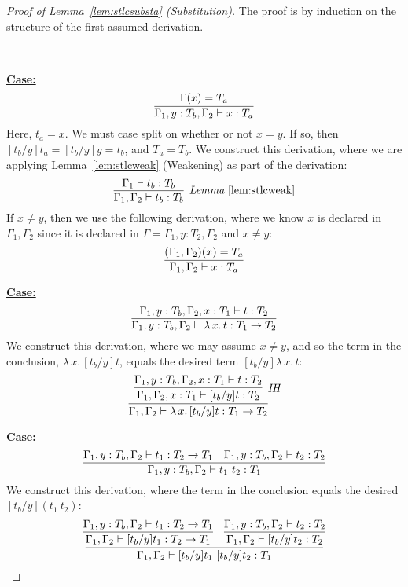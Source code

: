 \documentclass{article}
\begin{document}
\begin{proof}[Proof of Lemma~\ref{lem:stlcsubsta} (Substitution)]
The proof is by induction on the structure of the first assumed derivation.

\

\noindent \underline{\textbf{Case:}}
\[
\infer{\Gamma_1,y:T_b,\Gamma_2\vdash x : T_a}{\Gamma(x) = T_a}
\]
\noindent Here, $t_a = x$.  We must case split on whether or not $x =
y$.  If so, then $[t_b/y]t_a = [t_b/y]y = t_b$, and $T_a = T_b$.  We
construct this derivation, where we are applying
Lemma~\ref{lem:stlcweak} (Weakening) as part of the derivation:
\[
\infer[\textit{Lemma}~\ref{lem:stlcweak}]{\Gamma_1,\Gamma_2\vdash t_b:T_b}{\Gamma_1\vdash t_b:T_b}
\]
\noindent If $x\neq y$, then we use the following derivation, where we know $x$ is declared
in $\Gamma_1,\Gamma_2$ since it is declared in $\Gamma = \Gamma_1,y:T_2,\Gamma_2$ and
$x\neq y$:
\[
\infer{\Gamma_1,\Gamma_2\vdash x : T_a}{(\Gamma_1,\Gamma_2)(x) = T_a}
\]

\noindent \underline{\textbf{Case:}}
\[
\infer{\Gamma_1,y:T_b,\Gamma_2\vdash \lambda\,x.\,t : T_1\to T_2}{\Gamma_1,y:T_b,\Gamma_2,x:T_1\vdash t:T_2}
\]
\noindent We construct this derivation, where we may assume $x\neq y$, and so the term in
the conclusion, $\lambda\,x.\,[t_b/y]t$, equals the desired term $[t_b/y]\lambda\,x.\,t$:
\[
\infer{\Gamma_1,\Gamma_2\vdash \lambda\,x.\,[t_b/y]t : T_1\to T_2}
      {\infer[\textit{IH}]{\Gamma_1,\Gamma_2,x:T_1\vdash [t_b/y]t:T_2}{\Gamma_1,y:T_b,\Gamma_2,x:T_1\vdash t:T_2}}
\]

\noindent\underline{\textbf{Case:}}
\[
\infer{\Gamma_1,y:T_b,\Gamma_2\vdash t_1\ t_2 : T_1}
      {\Gamma_1,y:T_b,\Gamma_2\vdash t_1 : T_2 \to T_1 &
       \Gamma_1,y:T_b,\Gamma_2\vdash t_2 : T_2}
\]
\noindent We construct this derivation, where the term in the conclusion equals
the desired $[t_b/y](t_1\ t_2)$:
\[
\infer{\Gamma_1,\Gamma_2\vdash [t_b/y]t_1\ [t_b/y]t_2 : T_1}
      {\infer{\Gamma_1,\Gamma_2\vdash [t_b/y]t_1 : T_2 \to T_1}{\Gamma_1,y:T_b,\Gamma_2\vdash t_1 : T_2 \to T_1} &
       \infer{\Gamma_1,\Gamma_2\vdash [t_b/y]t_2 : T_2}{\Gamma_1,y:T_b,\Gamma_2\vdash t_2 : T_2}}
\]

\end{proof}
\end{document}

